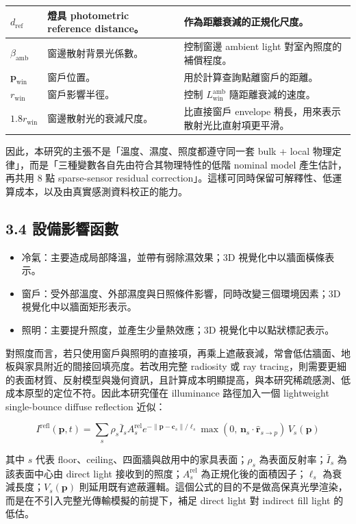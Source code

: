\documentclass[12pt,a4paper]{article}
\begin{document}
\begin{table}[htbp]
\begin{tabular}{|>{\raggedright\arraybackslash}p{}|>{\raggedright\arraybackslash}p{}|>{\raggedright\arraybackslash}p{}|}
\hline
$d_{\mathrm{ref}}$ & 燈具 photometric reference distance。 & 作為距離衰減的正規化尺度。 \\
\hline
$\beta_{\mathrm{amb}}$ & 窗邊散射背景光係數。 & 控制窗邊 ambient light 對室內照度的補償程度。 \\
\hline
$\mathbf{p}_{\mathrm{win}}$ & 窗戶位置。 & 用於計算查詢點離窗戶的距離。 \\
\hline
$r_{\mathrm{win}}$ & 窗戶影響半徑。 & 控制 $L_{\mathrm{win}}^{\mathrm{amb}}$ 隨距離衰減的速度。 \\
\hline
$1.8r_{\mathrm{win}}$ & 窗邊散射光的衰減尺度。 & 比直接窗戶 envelope 稍長，用來表示散射光比直射項更平滑。 \\
\hline
\end{tabular}
\end{table}

因此，本研究的主張不是「溫度、濕度、照度都遵守同一套 bulk + local 物理定律」，而是「三種變數各自先由符合其物理特性的低階 nominal model 產生估計，再共用 8 點 sparse-sensor residual correction」。這樣可同時保留可解釋性、低運算成本，以及由真實感測資料校正的能力。


\subsection*{3.4 設備影響函數}

\begin{itemize}
\item 冷氣：主要造成局部降溫，並帶有弱除濕效果；3D 視覺化中以牆面橫條表示。
\item 窗戶：受外部溫度、外部濕度與日照條件影響，同時改變三個環境因素；3D 視覺化中以牆面矩形表示。
\item 照明：主要提升照度，並產生少量熱效應；3D 視覺化中以點狀標記表示。
\end{itemize}

對照度而言，若只使用窗戶與照明的直接項，再乘上遮蔽衰減，常會低估牆面、地板與家具附近的間接回填亮度。若改用完整 radiosity 或 ray tracing，則需要更細的表面材質、反射模型與幾何資訊，且計算成本明顯提高，與本研究稀疏感測、低成本原型的定位不符。因此本研究僅在 illuminance 路徑加入一個 lightweight single-bounce diffuse reflection 近似：


\[
I^{\text{refl}}(\mathbf{p},t) = \sum_{s} \rho_s \bar{I}_s A_s^{\text{rel}} e^{-\|\mathbf{p}-\mathbf{c}_s\|/\ell_s} \max(0,\,\mathbf{n}_s \cdot \hat{\mathbf{r}}_{s\to p})\, V_s(\mathbf{p})
\]

其中 $s$ 代表 floor、ceiling、四面牆與啟用中的家具表面；$\rho_s$ 為表面反射率；$\bar{I}_s$ 為該表面中心由 direct light 接收到的照度；$A_s^{\text{rel}}$ 為正規化後的面積因子；$\ell_s$ 為衰減長度；$V_s(\mathbf{p})$ 則延用既有遮蔽邏輯。這個公式的目的不是做高保真光學渲染，而是在不引入完整光傳輸模擬的前提下，補足 direct light 對 indirect fill light 的低估。
\end{document}
